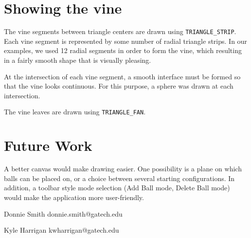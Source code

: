 \documentclass[letterpaper,10pt]{IEEEtran}
\begin{document}
\section{Showing the vine}

The vine segments between triangle centers are drawn using  \verb+TRIANGLE_STRIP+.  Each vine segment is represented by some number of radial triangle strips.  In our examples, we used 12 radial segments in order to form the vine, which resulting in a fairly smooth shape that is visually pleasing.  

At the intersection of each vine segment, a smooth interface must be formed so that the vine looks continuous.  For this purpose, a sphere was drawn at each intersection. 

The vine leaves are drawn using \verb+TRIANGLE_FAN+. 

\section{Future Work}


A better canvas would make drawing easier.
One possibility is a plane on which balls can be placed on, or a choice between several starting configurations.
In addition, a toolbar style mode selection (Add Ball mode, Delete Ball mode) would make the application more user-friendly.

\begin{IEEEbiography}{Donnie Smith} donnie.smith@gatech.edu
\end{IEEEbiography}

\begin{IEEEbiography}{Kyle Harrigan} kwharrigan@gatech.edu
\end{IEEEbiography}
\end{document}
